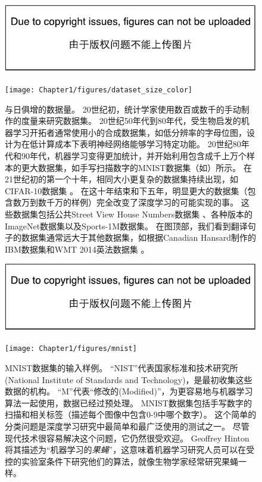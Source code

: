 \begin{figure}[!htb]
\ifOpenSource
\centerline{\includegraphics{figure.pdf}}
\else
\centerline{\texttt{[image: Chapter1/figures/dataset\_size\_color]}}
\fi
\caption{与日俱增的数据量。
20世纪初，统计学家使用数百或数千的手动制作的度量来研究数据集\citep{garson:1900,student08ttest,IrisData1935,Fisher-1936}。
20世纪50年代到80年代，受生物启发的机器学习开拓者通常使用小的合成数据集，如低分辨率的字母位图，设计为在低计算成本下表明神经网络能够学习特定功能\citep{Widrow60,Rumelhart86c}。
20世纪80年代和90年代，机器学习变得更加统计，并开始利用包含成千上万个样本的更大数据集，如手写扫描数字的MNIST数据集（如）所示\citep{LeCun98-small}。
在21世纪初的第一个十年，相同大小更复杂的数据集持续出现，如CIFAR-10数据集\citep{KrizhevskyHinton2009} 。
在这十年结束和下五年，明显更大的数据集（包含数万到数千万的样例）完全改变了深度学习的可能实现的事。
这些数据集包括公共Street View House Numbers数据集 \citep{Netzer-wkshp-2011}、各种版本的ImageNet数据集\citep{imagenet_cvpr09,Deng2010,ILSVRCarxiv14}以及Sports-1M数据集\citep{KarpathyCVPR14}。
在图顶部，我们看到翻译句子的数据集通常远大于其他数据集，如根据Canadian Hansard制作的IBM数据集\citep{brown1990statistical}和WMT 2014英法数据集\citep{wmt14} 。
}
\label{fig:chap1_dataset_size_color}
\end{figure}
\begin{figure}[!htb]
\ifOpenSource
\centerline{\includegraphics{figure.pdf}}
\else
\centerline{\texttt{[image: Chapter1/figures/mnist]}}
\fi
\caption{MNIST数据集的输入样例。
``NIST''代表国家标准和技术研究所(National Institute of Standards and Technology)，是最初收集这些数据的机构。
``M''代表``修改的(Modified)''，为更容易地与机器学习算法一起使用，数据已经过预处理。
MNIST数据集包括手写数字的扫描和相关标签（描述每个图像中包含0-9中哪个数字）。
这个简单的分类问题是深度学习研究中最简单和最广泛使用的测试之一。
尽管现代技术很容易解决这个问题，它仍然很受欢迎。
Geoffrey Hinton将其描述为``机器学习的\emph{果蝇}''，这意味着机器学习研究人员可以在受控的实验室条件下研究他们的算法，就像生物学家经常研究果蝇一样。
}
\label{fig:chap1_mnist}
\end{figure}

